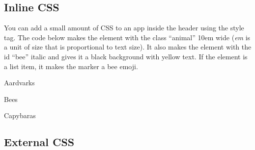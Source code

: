 \documentclass[
]{book}
\newenvironment{Shaded}{\begin{snugshade}}{\end{snugshade}}
\newcommand{\AttributeTok}[1]{\textcolor[rgb]{0.77,0.63,0.00}{#1}}
\newcommand{\FunctionTok}[1]{\textcolor[rgb]{0.00,0.00,0.00}{#1}}
\newcommand{\NormalTok}[1]{#1}
\newcommand{\OtherTok}[1]{\textcolor[rgb]{0.56,0.35,0.01}{#1}}
\newcommand{\SpecialCharTok}[1]{\textcolor[rgb]{0.00,0.00,0.00}{#1}}
\newcommand{\StringTok}[1]{\textcolor[rgb]{0.31,0.60,0.02}{#1}}
\begin{document}
\hypertarget{inline-css}{%
\subsection{Inline CSS}\label{inline-css}}

You can add a small amount of CSS to an app inside the header using the style tag. The code below makes the element with the class ``animal'' 10em wide (\emph{em} is a unit of size that is proportional to text size). It also makes the element with the id ``bee'' italic and gives it a black background with yellow text. If the element is a list item, it makes the marker a bee emoji.

\begin{Shaded}
\end{Shaded}

Aardvarks

Bees

Capybaras

\hypertarget{external-css}{%
\subsection{External CSS}\label{external-css}}
\end{document}
